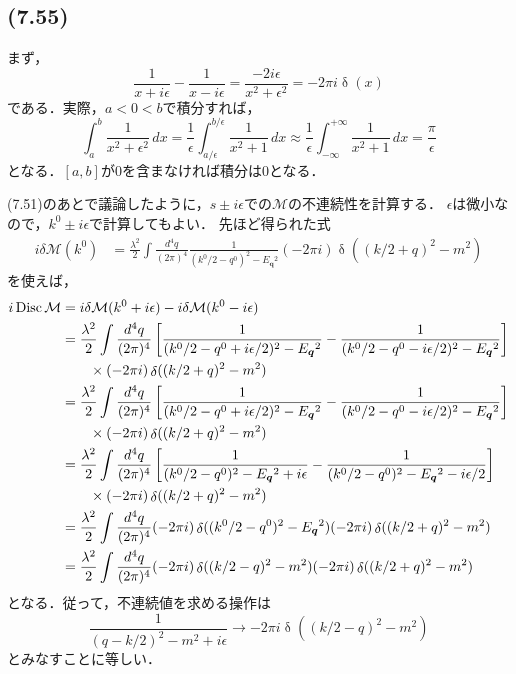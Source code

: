\subsection{(7.55)}
まず，
\[ \frac{1}{x + i\epsilon} - \frac{1}{x - i\epsilon} = \frac{-2i\epsilon}{x^2 + \epsilon^2} = -2\pi i \mathop\delta (x) \]
である．実際，$a < 0 < b$で積分すれば，
\[ \int_a^b \frac{1}{x^2 + \epsilon^2} \,dx = \frac{1}{\epsilon} \int_{a/\epsilon}^{b/\epsilon} \frac{1}{x^2+1} \, dx \approx \frac{1}{\epsilon} \int_{-\infty}^{+\infty} \frac{1}{x^2+1} \, dx = \frac{\pi}{\epsilon} \]
となる．$[a, b]$が$0$を含まなければ積分は$0$となる．

(7.51)のあとで議論したように，$s \pm i\epsilon$での$\mathcal{M}$の不連続性を計算する．
$\epsilon$は微小なので，$k^0 \pm i\epsilon$で計算してもよい．
先ほど得られた式
\begin{align*}
  i\delta\mathcal{M}(k^0) &= \frac{\lambda^2}{2} \int \frac{d^4q}{(2\pi)^4}
  \frac{1}{(k^0/2 - q^0)^2 - E_{\boldsymbol{q}}{}^2} (-2\pi i) \mathop\delta ((k/2 + q)^2 - m^2)
\end{align*}
を使えば，
\begin{align*}
  i\operatorname{Disc}\mathcal{M} &= i\delta\mathcal{M}(k^0+i\epsilon) -  i\delta\mathcal{M}(k^0-i\epsilon) \\
  &= \frac{\lambda^2}{2} \int \frac{d^4q}{(2\pi)^4}
  \left[ \frac{1}{(k^0/2 - q^0 + i\epsilon/2)^2 - E_{\boldsymbol{q}}{}^2} - \frac{1}{(k^0/2 - q^0 - i\epsilon/2)^2 - E_{\boldsymbol{q}}{}^2} \right] \\
  & \qquad \times (-2\pi i) \mathop\delta ((k/2 + q)^2 - m^2) \\
  &= \frac{\lambda^2}{2} \int \frac{d^4q}{(2\pi)^4}
  \left[ \frac{1}{(k^0/2 - q^0 + i\epsilon/2)^2 - E_{\boldsymbol{q}}{}^2} - \frac{1}{(k^0/2 - q^0 - i\epsilon/2)^2 - E_{\boldsymbol{q}}{}^2} \right] \\
  & \qquad \times (-2\pi i) \mathop\delta ((k/2 + q)^2 - m^2) \\
  &= \frac{\lambda^2}{2} \int \frac{d^4q}{(2\pi)^4}
  \left[ \frac{1}{(k^0/2 - q^0)^2 - E_{\boldsymbol{q}}{}^2 + i\epsilon} - \frac{1}{(k^0/2 - q^0)^2 - E_{\boldsymbol{q}}{}^2 - i\epsilon/2} \right] \\
  & \qquad \times (-2\pi i) \mathop\delta ((k/2 + q)^2 - m^2) \\
  &= \frac{\lambda^2}{2} \int \frac{d^4q}{(2\pi)^4}
  (-2\pi i) \mathop\delta ((k^0/2 - q^0)^2 - E_{\boldsymbol{q}}{}^2) (-2\pi i) \mathop\delta ((k/2 + q)^2 - m^2) \\
  &= \frac{\lambda^2}{2} \int \frac{d^4q}{(2\pi)^4} (-2\pi i) \mathop\delta ((k/2 - q)^2 - m^2) (-2\pi i) \mathop\delta ((k/2 + q)^2 - m^2)
\end{align*}
となる．従って，不連続値を求める操作は
\[ \frac{1}{(q - k/2)^2 - m^2 + i\epsilon} \to -2\pi i \mathop\delta ((k/2 - q)^2 - m^2) \]
とみなすことに等しい．

